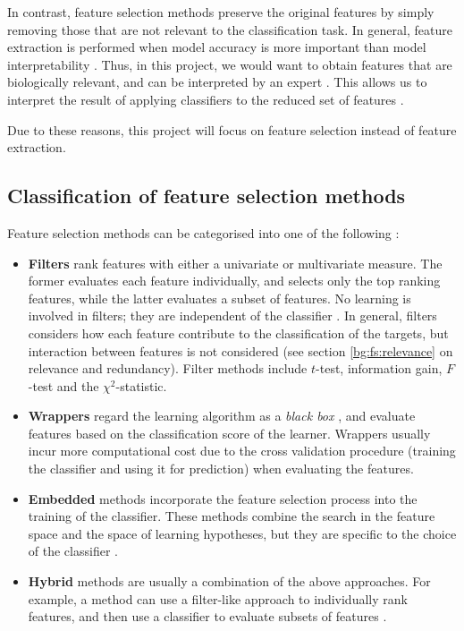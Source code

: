 \documentclass[12pt, twoside, a4paper]{report}
\begin{document}
In contrast, feature selection methods preserve the original features by simply removing those that are not relevant to the classification task. In general, feature extraction is performed when model accuracy is more important than model interpretability \cite{RefWorks:163}. Thus, in this project, we would want to obtain features that are biologically relevant, and can be interpreted by an expert \cite{RefWorks:192}. This allows us to interpret the result of applying classifiers to the reduced set of features \cite{RefWorks:142}.

Due to these reasons, this project will focus on feature selection instead of feature extraction.

\subsection{Classification of feature selection methods} \label{bg:fs:classification}

Feature selection methods can be categorised into one of the following \cite{RefWorks:117, RefWorks:118}:

\begin{itemize}
\item \textbf{Filters} rank features with either a univariate or multivariate measure. The former evaluates each feature individually, and selects only the top ranking features, while the latter evaluates a subset of features. No learning is involved in filters; they are independent of the classifier \cite{RefWorks:216}. In general, filters considers how each feature contribute to the classification of the targets, but interaction between features is not considered \cite{RefWorks:232} (see section \ref{bg:fs:relevance} on relevance and redundancy). Filter methods include $t$-test, information gain, $F$-test and the $\chi^2$-statistic.

\item \textbf{Wrappers} regard the learning algorithm as a \textit{black box} \cite{RefWorks:140}, and evaluate features based on the classification score of the learner. Wrappers usually incur more computational cost due to the cross validation procedure (training the classifier and using it for prediction) when evaluating the features.

\item \textbf{Embedded} methods incorporate the feature selection process into the training of the classifier. These methods combine the search in the feature space and the space of learning hypotheses, but they are specific to the choice of the classifier \cite{RefWorks:118}.

\item \textbf{Hybrid} methods are usually a combination of the above approaches. For example, a method can use a filter-like approach to individually rank features, and then use a classifier to evaluate subsets of features \cite{RefWorks:140}.

\end{itemize}
\end{document}
